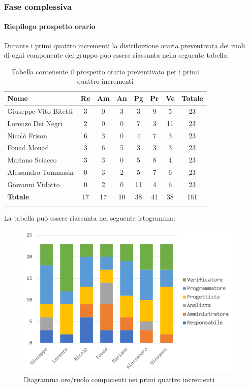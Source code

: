 		
		\subsubsection{Fase complessiva}
		\paragraph{Riepilogo prospetto orario}
		Durante i primi  quattro incrementi la distribuzione oraria preventivata dei ruoli di ogni componente del gruppo può essere riassunta nella seguente tabella:
		
		\begin{longtable}{|l|c|c|c|c|c|c|c|}
			\hline
			\rowcolor{lighter-grayer}
			\textbf{Nome} & \textbf{Re} & \textbf{Am} & \textbf{An} & \textbf{Pg}  & \textbf{Pr}   & \textbf{Ve} & \textbf{Totale} \\
			\hline
			\endfirsthead
			
			\hline
			Giuseppe Vito Bitetti 		 & 3 & 0 & 3 & 3 & 9 & 5 & 23\\
			\hline
			\hline
			Lorenzo Dei Negri			 & 2 & 0 & 0 & 7 & 3 & 11 & 23\\
			\hline
			\hline
			Nicolò Frison				    & 6 & 3 & 0 & 4 & 7 & 3 & 23\\
			\hline
			\hline
			Fouad Mouad 				 & 3 & 6 & 5 & 3 & 3 & 3 & 23\\
			\hline
			\hline
			Mariano Sciacco 			 & 3 & 3 & 0 & 5 & 8 & 4 & 23\\
			\hline
			\hline
			Alessandro Tommasin     & 0 & 3 & 2 & 5 & 7 & 6 & 23\\
			\hline
			\hline
			Giovanni Vidotto 			 & 0 & 2 & 0 & 11 & 4 & 6 & 23\\
			\hline 
			\textbf{Totale}			 		& 17 & 17 & 10 & 38 & 41 & 38 & 161\\
			\hline
			\caption{Tabella contenente il prospetto orario preventivato per i primi quattro incrementi}
		\end{longtable}
		\pagebreak
		
		La tabella può essere riassunta nel seguente istogramma:
		\begin{figure}[H]
			\centering
			\includegraphics[width=0.8\linewidth]{./images/preventivo/incremento1-4-1.png}
			\caption{Diagramma ore/ruolo componenti nei primi quattro incrementi}
			\label{fig:diagramma suddivione ruoli incrementi I-IV}
		\end{figure}
		
